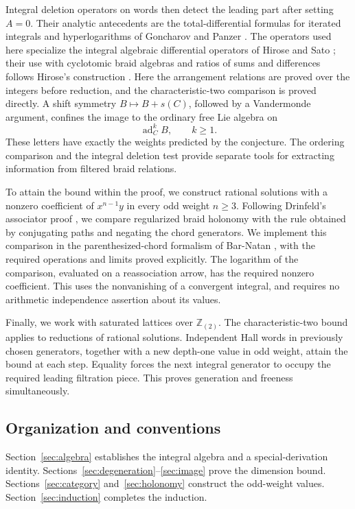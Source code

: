 \documentclass[11pt]{article}
\theoremstyle{definition}
\theoremstyle{remark}
\numberwithin{equation}{section}
\begin{document}
Integral deletion operators on words then detect the leading part
after setting \(A=0\).  Their analytic antecedents are the
total-differential formulas for iterated integrals and hyperlogarithms
of Goncharov \cite[Theorem~2.1]{Goncharov} and
Panzer \cite[Lemma~3.3.30]{Panzer}.
The operators used here specialize the integral
algebraic differential operators of Hirose and Sato
\cite[Section~2]{HiroseSato}; their use with cyclotomic braid algebras
and ratios of sums and differences follows Hirose's construction
\cite[Sections~4.3 and~6]{Hirose}.  Here the arrangement relations are proved over the
integers before reduction, and the characteristic-two comparison is
proved directly.  A shift symmetry
\(B\mapsto B+s(C)\), followed by a Vandermonde argument, confines the
image to the ordinary free Lie algebra on
\[
 \operatorname{ad}_C^kB,\qquad k\ge1.
\]
These letters have exactly the weights predicted by the conjecture.
The ordering comparison and the integral deletion test provide
separate tools for extracting information from filtered braid
relations.

To attain the bound within the proof, we construct rational solutions with a nonzero
coefficient of \(x^{n-1}y\) in every odd weight \(n\ge3\).
Following Drinfeld's associator proof
\cite[Proposition~6.3]{Drinfeld}, we compare regularized braid holonomy
with the rule obtained by conjugating paths and negating the chord
generators.  We implement
this comparison in the parenthesized-chord formalism of Bar-Natan
\cite[Sections~2--3]{BarNatan}, with the required operations and
limits proved explicitly.  The logarithm of the comparison,
evaluated on a reassociation arrow, has the required nonzero
coefficient.  This uses the nonvanishing of a convergent integral,
and requires no arithmetic independence assertion about its values.

Finally, we work with saturated lattices over \(\mathbb Z_{(2)}\).
The characteristic-two bound applies to reductions of rational
solutions.  Independent Hall words in previously chosen generators,
together with a new depth-one value in odd weight, attain the bound
at each step.
Equality forces the next integral generator to occupy the required
leading filtration piece.  This proves generation and freeness
simultaneously.

\subsection{Organization and conventions}
Section~\ref{sec:algebra} establishes the integral algebra and a
special-derivation identity.  Sections~\ref{sec:degeneration}--\ref{sec:image}
prove the dimension bound.  Sections~\ref{sec:category}
and~\ref{sec:holonomy} construct the odd-weight values.
Section~\ref{sec:induction} completes the induction.
\end{document}
